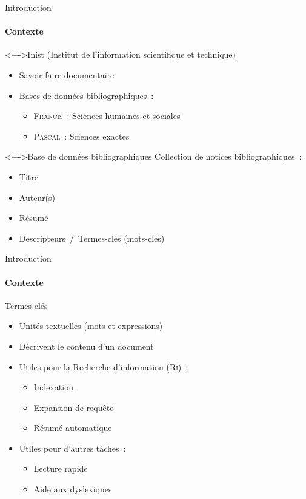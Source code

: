 \begin{frame}{Introduction}\framesubtitle{Contexte}

  \begin{block}<+->{Inist (Institut de l'information scientifique et technique)}
    \begin{itemize}
      \item{Savoir faire documentaire}
      \item{Bases de données bibliographiques~:}
      \begin{itemize}
        \item{\textsc{Francis}~: Sciences humaines et sociales}
        \item{\textsc{Pascal}~: Sciences exactes}
      \end{itemize}
    \end{itemize}
  \end{block}

  \begin{block}<+->{Base de données bibliographiques}
    Collection de notices bibliographiques~:
    \begin{itemize}
      \item{Titre}
      \item{Auteur(s)}
      \item{Résumé}
      \item{Descripteurs~/~Termes-clés (mots-clés)}
    \end{itemize}
  \end{block}
\end{frame}

\begin{frame}{Introduction}\framesubtitle{Contexte}
  \begin{block}{Termes-clés}
    \begin{itemize}
      \item<1->{Unités textuelles (mots et expressions)}
      \item<1->{Décrivent le contenu d'un document}
      \item<2->{Utiles pour la Recherche d'information (\textsc{Ri})~:}
      \begin{itemize}
        \item{Indexation}
        \item{Expansion de requête}
        \item{Résumé automatique}
      \end{itemize}
      \item<3->{Utiles pour d'autres tâches~:}
      \begin{itemize}
        \item{Lecture rapide}
        \item{Aide aux dyslexiques}
      \end{itemize}
    \end{itemize}
  \end{block}
\end{frame}

